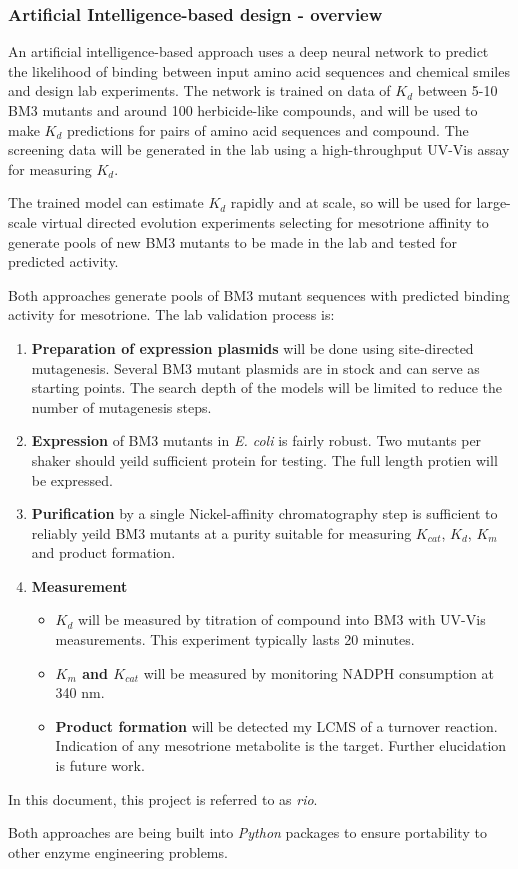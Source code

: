 \documentclass{article}
\begin{document}
\subsubsection{Artificial Intelligence-based design - overview}
An artificial intelligence-based approach uses a deep neural network to predict the likelihood of binding between input amino acid sequences and chemical smiles and design lab experiments. %
The network is trained on data of $K_d$ between 5-10 BM3 mutants and around 100 herbicide-like compounds, and will be used to make $K_d$ predictions for pairs of amino acid sequences and compound. %
The screening data will be generated in the lab using a high-throughput UV-Vis assay for measuring $K_d$. %
\par
The trained model can estimate $K_d$ rapidly and at scale, so will be used for large-scale virtual directed evolution experiments selecting for mesotrione affinity to generate pools of new BM3 mutants to be made in the lab and tested for predicted activity. %
\par
Both approaches generate pools of BM3 mutant sequences with predicted binding activity for mesotrione. The lab validation process is:%
\begin{enumerate}
	\item \textbf{Preparation of expression plasmids} will be done using site-directed mutagenesis. Several BM3 mutant plasmids are in stock and can serve as starting points. The search depth of the models will be limited to reduce the number of mutagenesis steps. %
	\item \textbf{Expression} of BM3 mutants in \textit{E. coli} is fairly robust. Two mutants per shaker should yeild sufficient protein for testing. The full length protien will be expressed.
	\item \textbf{Purification} by a single Nickel-affinity chromatography step is sufficient to reliably yeild BM3 mutants at a purity suitable for measuring $K_{cat}$, $K_d$, $K_m$ and product formation.
	\item \textbf{Measurement} 
		\begin{itemize}
			\item \textbf{$K_d$} will be measured by titration of compound into BM3 with UV-Vis measurements. This experiment typically lasts 20 minutes.
			\item \textbf{$K_m$ and $K_{cat}$} will be measured by monitoring NADPH consumption at 340 nm.
			\item \textbf{Product formation} will be detected my LCMS of a turnover reaction. Indication of any mesotrione metabolite is the target. Further elucidation is future work.
		\end{itemize}
\end{enumerate}
\par
In this document, this project is referred to as \textit{rio}. %
\par
Both approaches are being built into \textit{Python} packages to ensure portability to other enzyme engineering problems. %
\end{document}
